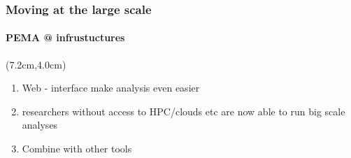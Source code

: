 \documentclass{beamer}
\begin{document}
   \begin{frame}
      \frametitle{Moving at the large scale}
      \framesubtitle{PEMA @ infrustuctures}
      \begin{singlespace}

         \begin{textblock*}{5cm}(7.2cm,4.0cm) %
            

            \begin{enumerate}
               \item \small Web - interface make analysis even easier
               \item \small researchers without access to HPC/clouds etc are now able to run big scale analyses
               \item \small Combine with other tools
            \end{enumerate}

         \end{textblock*}
         \end{singlespace}
   \end{frame}
\end{document}
